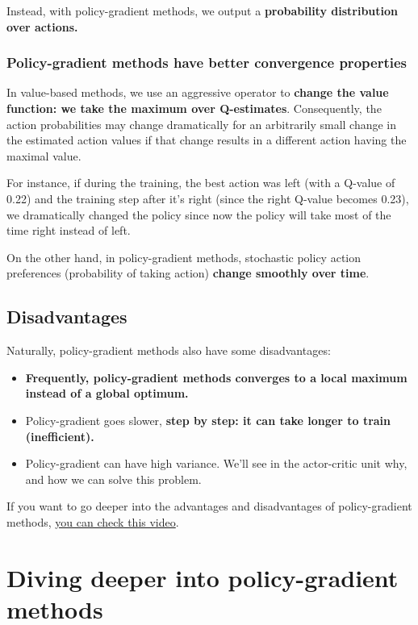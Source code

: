 \documentclass[11pt,a4paper]{article}
\begin{document}
Instead, with policy-gradient methods, we output a \textbf{probability distribution over actions.}

\subsubsection{Policy-gradient methods have better convergence properties}\label{policy-gradient-methods-have-better-convergence-properties}

In value-based methods, we use an aggressive operator to \textbf{change the value function: we take the maximum over Q-estimates}. Consequently, the action probabilities may change dramatically for an arbitrarily small change in the estimated action values if that change results in a different action having the maximal value.

For instance, if during the training, the best action was left (with a Q-value of 0.22) and the training step after it's right (since the right Q-value becomes 0.23), we dramatically changed the policy since now the policy will take most of the time right instead of left.

On the other hand, in policy-gradient methods, stochastic policy action preferences (probability of taking action) \textbf{change smoothly over time}.

\subsection{Disadvantages}\label{disadvantages}

Naturally, policy-gradient methods also have some disadvantages:

\begin{itemize}
\tightlist
\item
  \textbf{Frequently, policy-gradient methods converges to a local maximum instead of a global optimum.}
\item
  Policy-gradient goes slower, \textbf{step by step: it can take longer to train (inefficient).}
\item
  Policy-gradient can have high variance. We'll see in the actor-critic unit why, and how we can solve this problem.
\end{itemize}

If you want to go deeper into the advantages and disadvantages of policy-gradient methods, \href{https://youtu.be/y3oqOjHilio}{you can check this video}.

\section{Diving deeper into policy-gradient methods}\label{diving-deeper-into-policy-gradient-methods}
\end{document}
